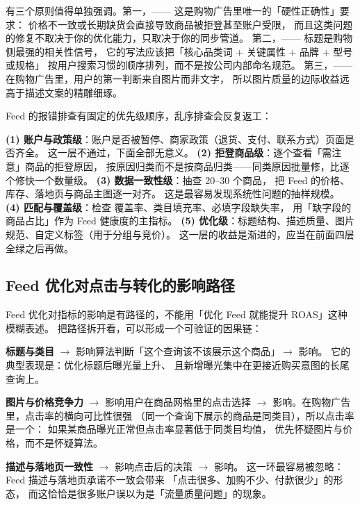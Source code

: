 有三个原则值得单独强调。第一，——
这是购物广告里唯一的「硬性正确性」要求：
价格不一致或长期缺货会直接导致商品被拒登甚至账户受限，
而且这类问题的修复不取决于你的优化能力，只取决于你的同步管道。
第二，——
标题是购物侧最强的相关性信号，
它的写法应该把「核心品类词 + 关键属性 + 品牌 + 型号或规格」
按用户搜索习惯的顺序排列，而不是按公司内部命名规范。
第三，——
在购物广告里，用户的第一判断来自图片而非文字，
所以图片质量的边际收益远高于描述文案的精雕细琢。

Feed 的报错排查有固定的优先级顺序，乱序排查会反复返工：

\begin{toolbox}
\textbf{(1) 账户与政策级}：账户是否被暂停、商家政策（退货、支付、联系方式）页面是否齐全。
这一层不通过，下面全部无意义。
\textbf{(2) 拒登商品级}：逐个查看「需注意」商品的拒登原因，
按原因归类而不是按商品归类——同类原因批量修，比逐个修快一个数量级。
\textbf{(3) 数据一致性级}：抽查 20--30 个商品，
把 Feed 的价格、库存、落地页与商品主图逐一对齐。
这是最容易发现系统性问题的抽样规模。
\textbf{(4) 匹配与覆盖级}：检查  覆盖率、类目填充率、必填字段缺失率，
用「缺字段的商品占比」作为 Feed 健康度的主指标。
\textbf{(5) 优化级}：标题结构、描述质量、图片规范、自定义标签（用于分组与竞价）。
这一层的收益是渐进的，应当在前面四层全绿之后再做。
\end{toolbox}

\subsection{Feed 优化对点击与转化的影响路径}

Feed 优化对指标的影响是有路径的，不能用「优化 Feed 就能提升 ROAS」这种模糊表述。
把路径拆开看，可以形成一个可验证的因果链：

\textbf{标题与类目} $\to$ 影响算法判断「这个查询该不该展示这个商品」$\to$
影响。
它的典型表现是：优化标题后曝光量上升、
且新增曝光集中在更接近购买意图的长尾查询上。

\textbf{图片与价格竞争力} $\to$ 影响用户在商品网格里的点击选择 $\to$
影响。在购物广告里，点击率的横向可比性很强
（同一个查询下展示的商品是同类目），所以点击率是一个：
如果某商品曝光正常但点击率显著低于同类目均值，
优先怀疑图片与价格，而不是怀疑算法。

\textbf{描述与落地页一致性} $\to$ 影响点击后的决策 $\to$
影响。
这一环最容易被忽略：Feed 描述与落地页承诺不一致会带来
「点击很多、加购不少、付款很少」的形态，
而这恰恰是很多账户误以为是「流量质量问题」的现象。

